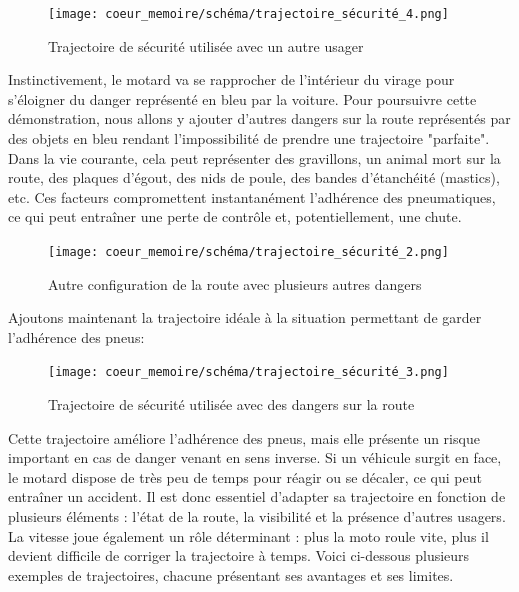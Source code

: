 \begin{figure}[H]
    \centering
    \texttt{[image: coeur\_memoire/schéma/trajectoire\_sécurité\_4.png]} 
    \caption{Trajectoire de sécurité utilisée avec un autre usager}
\end{figure}
Instinctivement, le motard va se rapprocher de l'intérieur du virage pour s'éloigner du danger représenté en bleu par la voiture.
Pour poursuivre cette démonstration, nous allons y ajouter d'autres dangers sur la route représentés par des objets en bleu rendant l'impossibilité de prendre une trajectoire "parfaite". Dans la vie courante, cela peut représenter des gravillons, un animal mort sur la route, des plaques d'égout, des nids de poule, des bandes d'étanchéité (mastics), etc. Ces facteurs compromettent instantanément l’adhérence des pneumatiques, ce qui peut entraîner une perte de contrôle et, potentiellement, une chute.
\begin{figure}[H]
    \centering
    \texttt{[image: coeur\_memoire/schéma/trajectoire\_sécurité\_2.png]} 
    \caption{Autre configuration de la route avec plusieurs autres dangers}
\end{figure}
Ajoutons maintenant la trajectoire idéale à la situation permettant de garder l'adhérence des pneus:
\begin{figure}[H]
    \centering
    \texttt{[image: coeur\_memoire/schéma/trajectoire\_sécurité\_3.png]} 
    \caption{Trajectoire de sécurité utilisée avec des dangers sur la route}
    \label{fig:trajectoire_securite_difficulte}
\end{figure}
Cette trajectoire améliore l’adhérence des pneus, mais elle présente un risque important en cas de danger venant en sens inverse. Si un véhicule surgit en face, le motard dispose de très peu de temps pour réagir ou se décaler, ce qui peut entraîner un accident. Il est donc essentiel d’adapter sa trajectoire en fonction de plusieurs éléments : l’état de la route, la visibilité et la présence d’autres usagers. La vitesse joue également un rôle déterminant : plus la moto roule vite, plus il devient difficile de corriger la trajectoire à temps. Voici ci-dessous plusieurs exemples de trajectoires, chacune présentant ses avantages et ses limites.
